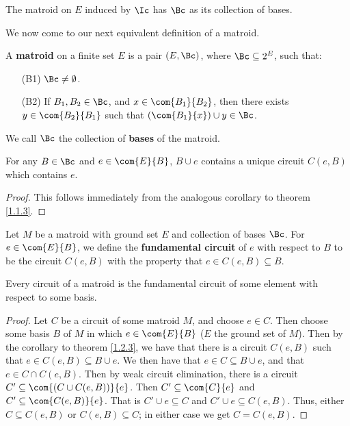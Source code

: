 \begin{corollary}
    The matroid on $E$ induced by  $\Ic$ has  $\Bc$ as its collection of bases.
\end{corollary}

We now come to our next equivalent definition of a matroid.

\begin{definition}
    A \textbf{matroid} on a finite set $E$ is a pair $(E,\Bc)$, where $\Bc
    \subseteq 2^E$, such that:
    \begin{enumerate}
        \item[(B1)] $\Bc \neq \emptyset$.

        \item [(B2)] If $B_1,B_2 \in \Bc$, and $x \in \com{B_1}{B_2}$, then
            there exists $y \in \com{B_2}{B_1}$ such that $(\com{B_1}{x}) \cup y
            \in \Bc$.
    \end{enumerate}
    We call $\Bc$ the collection of \textbf{bases} of the matroid.
\end{definition}
\begin{corollary}
    For any $B \in \Bc$ and $e \in \com{E}{B}$, $B \cup e$ contains a unique
    circuit  $C(e,B)$ which contains $e$.
\end{corollary}
\begin{proof}
    This follows immediately from the analogous corollary to theorem
    \ref{1.1.3}.
\end{proof}

\begin{definition}
    Let $M$ be a matroid with ground set $E$ and collection of bases $\Bc$. For
    $e \in \com{E}{B}$, we define the \textbf{fundamental circuit} of $e$ with
    respect to  $B$ to be the circuit $C(e,B)$ with the property that $e \in
    C(e,B) \subseteq B$.
\end{definition}

\begin{lemma}\label{1.2.4}
    Every circuit of a matroid is the fundamental circuit of some element with
    respect to some basis.
\end{lemma}
\begin{proof}
    Let $C$ be a circuit of some matroid $M$, and choose $e \in C$. Then choose
    some basis $B$ of  $M$ in which  $e \in \com{E}{B}$ ($E$ the ground set of
    $M$). Then by the corollary to theorem \ref{1.2.3}, we have that there is a
    circuit $C(e,B)$ such that $e \in C(e,B) \subseteq B \cup e$. We then have
    that $e \in C \subseteq B \cup e$, and that  $e \in C \cap C(e,B)$. Then by
    weak circuit elimination, there is a circuit $C' \subseteq \com{(C \cup
    C(e,B))}{e}$. Then $C' \subseteq \com{C}{e}$ and $C' \subseteq
    \com{C(e,B)}{e}$. That is $C' \cup e \subseteq C$ and  $C' \cup e \subseteq
    C(e,B)$. Thus, either $C \subseteq C(e,B)$ or $C(e,B) \subseteq C$; in
    either case we get $C=C(e,B)$.
\end{proof}

